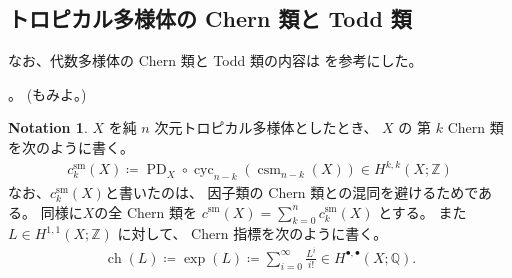 \documentclass[a4paper,dvipdfmx,reqno,12pt]{amsart}
\theoremstyle{definition}
\newtheorem{notation}[theorem]{Notation}
\newcommand{\deq}{\coloneqq}
\newcommand{\opn}[1]{\operatorname{#1}}
\numberwithin{equation}{section}
\begin{document}
\subsection{トロピカル多様体の Chern 類と Todd 類}

なお、代数多様体の Chern 類と Todd 類の内容は
\cite{MR1335917,MR1644323,MR2810322} を参考にした。

\cite[Definition 5.4]{MR4637248}。
(\cite[Definition 4.13]{MR3894860}もみよ。)


\begin{notation}
$X$ を純 $n$ 次元トロピカル多様体としたとき、
$X$ の 第 $k$ Chern 類を次のように書く。 
\begin{align}
c_{k}^{\mathrm{sm}}(X)\deq
\opn{PD}_X\circ \opn{cyc}_{n-k}(\opn{csm}_{n-k}(X))
\in H^{k,k}(X;\mathbb{Z})
\end{align}
なお、$c_{k}^{\mathrm{sm}}(X)$と書いたのは、
因子類の Chern 類との混同を避けるためである。
同様に$X$の全 Chern 類を
$c^{\mathrm{sm}}(X)=\sum_{k=0}^{n} c_{k}^{\mathrm{sm}}(X)$
とする。
また $L\in H^{1,1}(X;\mathbb{Z})$ に対して、
Chern 指標を次のように書く。
\begin{align}
\opn{ch}(L)\deq \opn{exp}(L)
\deq \sum_{i=0}^{\infty}\frac{L^{i}}{i!}\in 
H^{\bullet,\bullet}(X;\mathbb{Q}).
\end{align}
\end{notation}
\end{document}
